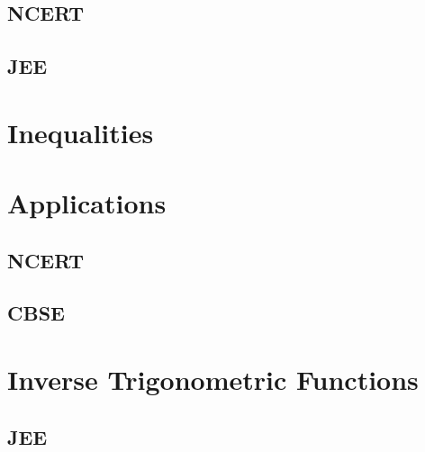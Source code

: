 \documentclass[journal]{IEEEtran}
\begin{document}
\subsection{NCERT}
 
\subsection{JEE}
 
\section{Inequalities}

\section{Applications}
\subsection{NCERT}

\subsection{CBSE}

\section{Inverse Trigonometric Functions}
\subsection{JEE}
 
%
% 
\end{document}

